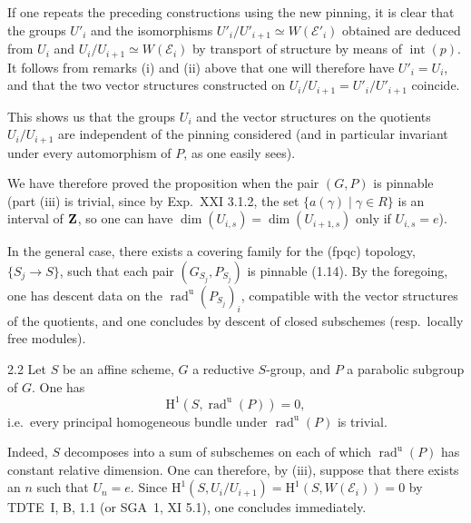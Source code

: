 If one repeats the preceding constructions using the new pinning, it is clear that the groups $U'_i$ and the isomorphisms $U'_i/U'_{i+1}\simeq W(\mathcal E'_i)$ obtained are deduced from $U_i$ and $U_i/U_{i+1}\simeq W(\mathcal E_i)$ by transport of structure by means of $\operatorname{int}(p)$. It follows from remarks (i) and (ii) above that one will therefore have $U'_i=U_i$, and that the two vector structures constructed on $U_i/U_{i+1}=U'_i/U'_{i+1}$ coincide.

This shows us that the groups $U_i$ and the vector structures on the quotients $U_i/U_{i+1}$ are independent of the pinning considered (and in particular invariant under every automorphism of $P$, as one easily sees).

We have therefore proved the proposition when the pair $(G,P)$ is pinnable (part (iii) is trivial, since by Exp.~XXI 3.1.2, the set $\{a(\gamma)\mid\gamma\in R\}$ is an interval of $\mathbf{Z}$, so one can have $\dim(U_{i,s})=\dim(U_{i+1,s})$ only if $U_{i,s}=e$).

\label{XXVI.2.1.3}
In the general case, there exists a covering family for the (fpqc) topology, $\{S_j\to S\}$, such that each pair $(G_{S_j},P_{S_j})$ is pinnable (1.14). By the foregoing, one has descent data on the $\operatorname{rad}^{\mathrm u}(P_{S_j})_i$, compatible with the vector structures of the quotients, and one concludes by descent of closed subschemes (resp.~locally free modules).

\begin{corollary}{2.2}\label{XXVI.2.2}
Let $S$ be an affine scheme, $G$ a reductive $S$-group, and $P$ a parabolic subgroup of $G$. One has
\[
\mathrm H^1(S,\operatorname{rad}^{\mathrm u}(P))=0,
\]
i.e.~every principal homogeneous bundle under $\operatorname{rad}^{\mathrm u}(P)$ is trivial.
\end{corollary}
Indeed, $S$ decomposes into a sum of subschemes on each of which $\operatorname{rad}^{\mathrm u}(P)$ has constant relative dimension. One can therefore, by (iii), suppose that there exists an $n$ such that $U_n=e$. Since $\mathrm H^1(S,U_i/U_{i+1})=\mathrm H^1(S,W(\mathcal E_i))=0$ by TDTE~I, B, 1.1 (or SGA~1, XI 5.1), one concludes immediately.

